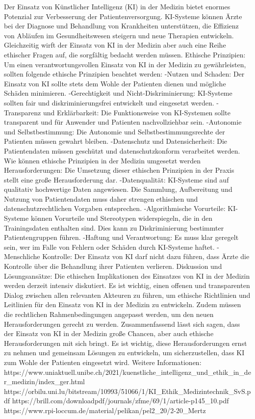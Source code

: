 \documentclass{article}
\begin{document}
{    Der Einsatz von Künstlicher Intelligenz (KI) in der Medizin bietet enormes Potenzial zur Verbesserung der Patientenversorgung. KI-Systeme können Ärzte bei der Diagnose und Behandlung von Krankheiten unterstützen, die Effizienz von Abläufen im Gesundheitswesen steigern und neue Therapien entwickeln.
    Gleichzeitig wirft der Einsatz von KI in der Medizin aber auch eine Reihe ethischer Fragen auf, die sorgfältig bedacht werden müssen.
    Ethische Prinzipien:
    Um einen verantwortungsvollen Einsatz von KI in der Medizin zu gewährleisten, sollten folgende ethische Prinzipien beachtet werden:
    -Nutzen und Schaden: Der Einsatz von KI sollte stets dem Wohle der Patienten dienen und mögliche Schäden minimieren.
    -Gerechtigkeit und Nicht-Diskriminierung: KI-Systeme sollten fair und diskriminierungsfrei entwickelt und eingesetzt werden.
    -Transparenz und Erklärbarkeit: Die Funktionsweise von KI-Systemen sollte transparent und für Anwender und Patienten nachvollziehbar sein.
    -Autonomie und Selbstbestimmung: Die Autonomie und Selbstbestimmungsrechte der Patienten müssen gewahrt bleiben.
    -Datenschutz und Datensicherheit: Die Patientendaten müssen geschützt und datenschutzkonform verarbeitet werden.
    Wie können ethische Prinzipien in der Medizin umgesetzt werden
    Herausforderungen:
    Die Umsetzung dieser ethischen Prinzipien in der Praxis stellt eine große Herausforderung dar.
    -Datenqualität: KI-Systeme sind auf qualitativ hochwertige Daten angewiesen. Die Sammlung, Aufbereitung und Nutzung von Patientendaten muss daher strengen ethischen und datenschutzrechtlichen Vorgaben entsprechen.
    -Algorithmische Vorurteile: KI-Systeme können Vorurteile und Stereotypen widerspiegeln, die in den Trainingsdaten enthalten sind. Dies kann zu Diskriminierung bestimmter Patientengruppen führen.
    -Haftung und Verantwortung: Es muss klar geregelt sein, wer im Falle von Fehlern oder Schäden durch KI-Systeme haftet.
    -Menschliche Kontrolle: Der Einsatz von KI darf nicht dazu führen, dass Ärzte die Kontrolle über die Behandlung ihrer Patienten verlieren.
    Diskussion und Lösungsansätze:
    Die ethischen Implikationen des Einsatzes von KI in der Medizin werden derzeit intensiv diskutiert.
    Es ist wichtig, einen offenen und transparenten Dialog zwischen allen relevanten Akteuren zu führen, um ethische Richtlinien und Leitlinien für den Einsatz von KI in der Medizin zu entwickeln.
    Zudem müssen die rechtlichen Rahmenbedingungen angepasst werden, um den neuen Herausforderungen gerecht zu werden.
    Zusammenfassend lässt sich sagen, dass der Einsatz von KI in der Medizin große Chancen, aber auch ethische Herausforderungen mit sich bringt. Es ist wichtig, diese Herausforderungen ernst zu nehmen und gemeinsam Lösungen zu entwickeln, um sicherzustellen, dass KI zum Wohle der Patienten eingesetzt wird.
    Weitere Informationen:
    https://www.uniaktuell.unibe.ch/2021/kuenstliche_intelligenz_und_ethik_in_der_medizin/index_ger.html
    https://orbilu.uni.lu/bitstream/10993/51066/1/KI_Ethik_Medizintechnik_SvS.pdf
    https://brill.com/downloadpdf/journals/zfme/69/1/article-p145_10.pdf
    https://www.rpi-loccum.de/material/pelikan/pel2_20/2-20_Mertz
    
}
\end{document}
